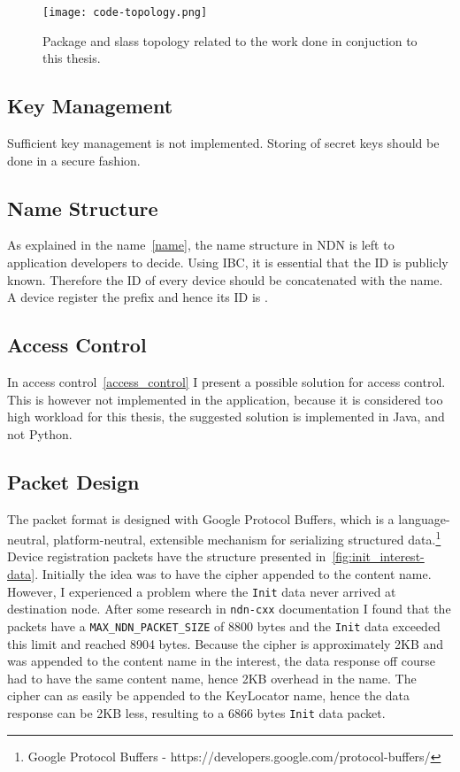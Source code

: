 \begin{figure}[ht]
  \centering
  \texttt{[image: code-topology.png]}
  \caption[Class topology]{Package and slass topology related to the work done in conjuction to this thesis.}
  \label{fig:code-topology}
\end{figure}

\subsection{Key Management}
Sufficient key management is not implemented.
Storing of secret keys should be done in a secure fashion.

\subsection{Name Structure}
As explained in the \gls{name}~\autoref{name}, the \gls{name} structure in \gls{NDN} is left to application developers to decide.
Using \gls{IBC}, it is essential that the \gls{ID} is publicly known.
Therefore the \gls{ID} of every device should be concatenated with the \gls{name}.
A device register the prefix  and hence its \gls{ID} is .

\subsection{Access Control}
In access control~\autoref{access_control} I present a possible solution for access control.
This is however not implemented in the application, because it is considered too high workload for this thesis, the suggested solution is implemented in Java, and not Python.

\subsection{Packet Design}
The packet format is designed with Google Protocol Buffers, which is a language-neutral, platform-neutral, extensible mechanism for serializing structured data.\footnote{Google Protocol Buffers - https://developers.google.com/protocol-buffers/}
Device registration packets have the structure presented in~\autoref{fig:init_interest-data}.
Initially the idea was to have the cipher appended to the content \gls{name}. 
However, I experienced a problem where the \texttt{Init} \gls{data} never arrived at destination node. 
After some research in \texttt{ndn-cxx} documentation I found that the packets have a \texttt{MAX\_NDN\_PACKET\_SIZE} of 8800 bytes and the \texttt{Init} \gls{data} exceeded this limit and reached 8904 bytes.
Because the cipher is approximately 2\gls{KB} and was appended to the content \gls{name} in the \gls{interest}, the \gls{data} response off course had to have the same content \gls{name}, hence 2\gls{KB} overhead in the \gls{name}. 
The cipher can as easily be appended to the KeyLocator \gls{name}, hence the \gls{data} response can be 2\gls{KB} less, resulting to a 6866 bytes \texttt{Init} \gls{data} packet.

